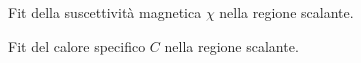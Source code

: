 \documentclass[a4paper,11pt]{article}
\begin{document}
	
	\begin{figure}
        \centering
        \caption{Fit della suscettività magnetica $\chi$ nella regione scalante.}
        \label{fig:chi_fit}
	\end{figure}

	\begin{figure}
        \centering
        \caption{Fit del calore specifico $C$ nella regione scalante.}
        \label{fig:C_fit}
	\end{figure}
	
\end{document}
